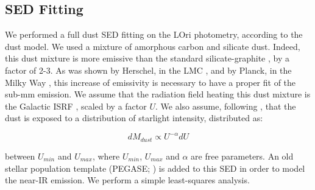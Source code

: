 \subsection{SED Fitting}

We performed a full dust SED fitting on the LOri photometry, according to the \cite{galliano11} dust model. We used a mixture of amorphous carbon and silicate dust. Indeed, this dust mixture is more emissive than the standard silicate-graphite \citep{draine07}, by a factor of 2-3. As was shown by Herschel, in the LMC \citep{galliano11}, and by Planck, in the Milky Way \citep{planck16}, this increase of emissivity is necessary to have a proper fit of the sub-mm emission. We assume that the radiation field heating this dust mixture is the Galactic ISRF \citep{math83}, scaled by a factor $U$. We also assume, following \cite{dale01}, that the dust is exposed to a distribution of starlight intensity, distributed as:

\begin{equation}
   \label{eq:U}
     dM_{dust}\propto{} U^{-\alpha}dU
\end{equation}

between $U_{min}$ and $U_{max}$, where $U_{min}$, $U_{max}$ and $\alpha{}$ are free parameters. An old stellar population template (PEGASE; \citep{fioc97}) is added to this SED in order to model the near-IR emission. We perform a simple least-squares analysis.
